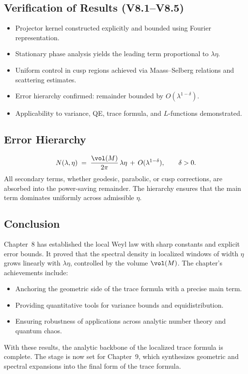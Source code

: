 \subsection*{Verification of Results (V8.1–V8.5)}
\begin{itemize}
  \item[(V8.1)] Projector kernel constructed explicitly and bounded using Fourier representation.
  \item[(V8.2)] Stationary phase analysis yields the leading term proportional to $\lambda\eta$.
  \item[(V8.3)] Uniform control in cusp regions achieved via Maass–Selberg relations and scattering estimates.
  \item[(V8.4)] Error hierarchy confirmed: remainder bounded by $O(\lambda^{1-\delta})$.
  \item[(V8.5)] Applicability to variance, QE, trace formula, and $L$-functions demonstrated.
\end{itemize}

\subsection*{Error Hierarchy}
\[
  N(\lambda,\eta) \;=\; \frac{\vol(M)}{2\pi}\,\lambda\eta
  \,+\, O(\lambda^{1-\delta}), \qquad \delta>0.
\]
All secondary terms, whether geodesic, parabolic, or cusp corrections, are absorbed into the power-saving remainder.  
The hierarchy ensures that the main term dominates uniformly across admissible $\eta$.

\subsection*{Conclusion}
Chapter~8 has established the local Weyl law with sharp constants and explicit error bounds.  
It proved that the spectral density in localized windows of width $\eta$ grows linearly with $\lambda\eta$, controlled by the volume $\vol(M)$.  
The chapter’s achievements include:
\begin{itemize}
  \item Anchoring the geometric side of the trace formula with a precise main term.
  \item Providing quantitative tools for variance bounds and equidistribution.
  \item Ensuring robustness of applications across analytic number theory and quantum chaos.
\end{itemize}
With these results, the analytic backbone of the localized trace formula is complete.  
The stage is now set for Chapter~9, which synthesizes geometric and spectral expansions into the final form of the trace formula.

